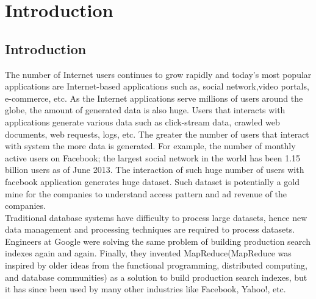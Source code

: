 
\chapter{Introduction} %

\label{Chapter1} %



\section{Introduction}

The number of Internet users continues to grow rapidly and today's most popular applications are Internet-based applications such as, social network,video portals, e-commerce, etc. As the Internet applications serve millions of users around the globe, the amount of generated data is also huge. Users that interacts with applications generate various data such as  click-stream data, crawled web documents, web requests, logs, etc. The greater the number of users that interact with system the more data is generated. For example, the number of monthly active users on Facebook; the largest social network in the world has been 1.15 billion users as of June 2013.\cite{fb1} The interaction of such huge number of users with facebook application generates huge dataset. Such dataset is potentially a gold mine for the companies to understand access pattern and ad revenue of the companies\cite{mat1}.\\ 

 Traditional database systems have difficulty to process large datasets, hence new data management and processing techniques are required to process datasets\cite{ieee1}. Engineers at Google were solving the same problem of building production search indexes again and again. Finally, they invented MapReduce(MapReduce was inspired by older ideas from the functional programming, distributed computing, and database communities) as a solution to build production search indexes, but it has since been used by many other industries like Facebook, Yahoo!, etc.\\ 

